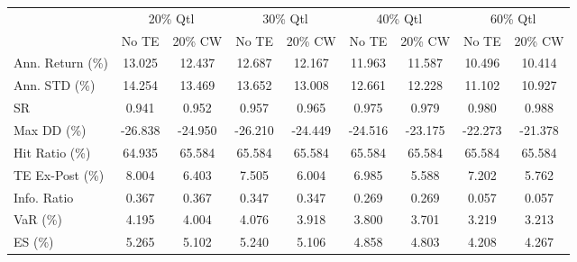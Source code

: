 \begin{tabular}{lcccccccc}
\toprule
{} & \multicolumn{2}{c}{20\% Qtl} & \multicolumn{2}{c}{30\% Qtl} & \multicolumn{2}{c}{40\% Qtl} & \multicolumn{2}{c}{60\% Qtl} \\
{} &   No TE &  20\% CW &   No TE &  20\% CW &   No TE &  20\% CW &   No TE &  20\% CW \\
\midrule
Ann. Return (\%) &  13.025 &  12.437 &  12.687 &  12.167 &  11.963 &  11.587 &  10.496 &  10.414 \\
Ann. STD (\%)    &  14.254 &  13.469 &  13.652 &  13.008 &  12.661 &  12.228 &  11.102 &  10.927 \\
SR              &   0.941 &   0.952 &   0.957 &   0.965 &   0.975 &   0.979 &   0.980 &   0.988 \\
Max DD (\%)      & -26.838 & -24.950 & -26.210 & -24.449 & -24.516 & -23.175 & -22.273 & -21.378 \\
Hit Ratio (\%)   &  64.935 &  65.584 &  65.584 &  65.584 &  65.584 &  65.584 &  65.584 &  65.584 \\
TE Ex-Post (\%)  &   8.004 &   6.403 &   7.505 &   6.004 &   6.985 &   5.588 &   7.202 &   5.762 \\
Info. Ratio     &   0.367 &   0.367 &   0.347 &   0.347 &   0.269 &   0.269 &   0.057 &   0.057 \\
VaR (\%)         &   4.195 &   4.004 &   4.076 &   3.918 &   3.800 &   3.701 &   3.219 &   3.213 \\
ES (\%)          &   5.265 &   5.102 &   5.240 &   5.106 &   4.858 &   4.803 &   4.208 &   4.267 \\
\bottomrule
\end{tabular}
